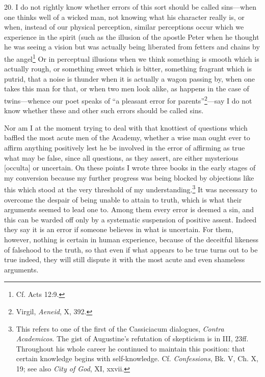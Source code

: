 
20. I do not rightly know whether errors of this sort should be called sins—when one thinks well of a wicked man, not knowing what his character really is, or when, instead of our physical perception, similar perceptions occur which we experience in the spirit (such as the illusion of the apostle Peter when he thought he was seeing a vision but was actually being liberated from fetters and chains by the angel\footnote{Cf. Acts 12:9.} Or in perceptual illusions when we think something is smooth which is actually rough, or something sweet which is bitter, something fragrant which is putrid, that a noise is thunder when it is actually a wagon passing by, when one takes this man for that, or when two men look alike, as happens in the case of twins—whence our poet speaks of ``a pleasant error for parents''\footnote{Virgil, \emph{Aeneid}, X, 392.}—say I do not know whether these and other such errors should be called sins.

Nor am I at the moment trying to deal with that knottiest of questions which baffled the most acute men of the Academy, whether a wise man ought ever to affirm anything positively lest he be involved in the error of affirming as true what may be false, since all questions, as they assert, are either mysterious [occulta] or uncertain. On these points I wrote three books in the early stages of my conversion because my further progress was being blocked by objections like this which stood at the very threshold of my understanding.\footnote{This refers to one of the first of the Cassiciacum dialogues, \emph{Contra Academicos}. The gist of Augustine's refutation of skepticism is in III, 23ff. Throughout his whole career he continued to maintain this position: that certain knowledge begins with self-knowledge. Cf. \emph{Confessions}, Bk. V, Ch. X, 19; see also \emph{City of God}, XI, xxvii.} It was necessary to overcome the despair of being unable to attain to truth, which is what their arguments seemed to lead one to. Among them every error is deemed a sin, and this can be warded off only by a systematic suspension of positive assent. Indeed they say it is an error if someone believes in what is uncertain. For them, however, nothing is certain in human experience, because of the deceitful likeness of falsehood to the truth, so that even if what appears to be true turns out to be true indeed, they will still dispute it with the most acute and even shameless arguments.

